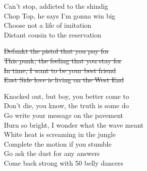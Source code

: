 Can't stop, addicted to the shindig \\
Chop Top, he says I'm gonna win big \\
Choose not a life of imitation \\
Distant cousin to the reservation \\

\begin{footnotesize}
	{\color{gray}\sout{
			Defunkt the pistol that you pay for \\
			This punk, the feeling that you stay for \\
			In time, I want to be your best friend \\
			East Side love is living on the West End \\
		}}
\end{footnotesize}

Knocked out, but boy, you better come to \\
Don't die, you know, the truth is some do \\
Go write your message on the pavement \\
Burn so bright, I wonder what the wave meant \\

White heat is screaming in the jungle \\
Complete the motion if you stumble \\
Go ask the dust for any answers \\
Come back strong with 50 belly dancers
